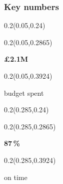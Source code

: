 \documentclass[aspectratio=169]{beamer}
\begin{document}
\begin{frame}[t]
  \frametitle{Key numbers}

%
\begin{textblock}{0.2}(0.05,0.24)
\end{textblock}

\begin{textblock}{0.2}(0.05,0.2865)
{\centering\fontsize{26}{31}\selectfont \textcolor[HTML]{FFFFFF}{\textbf{£2.1M}}\par}
\end{textblock}

\begin{textblock}{0.2}(0.05,0.3924)
{\centering\fontsize{12}{14}\selectfont \textcolor[HTML]{FFFFFF}{budget spent}\par}
\end{textblock}

%
\begin{textblock}{0.2}(0.285,0.24)
\end{textblock}

\begin{textblock}{0.2}(0.285,0.2865)
{\centering\fontsize{26}{31}\selectfont \textcolor[HTML]{FFFFFF}{\textbf{87\,\%}}\par}
\end{textblock}

\begin{textblock}{0.2}(0.285,0.3924)
{\centering\fontsize{12}{14}\selectfont \textcolor[HTML]{FFFFFF}{on time}\par}
\end{textblock}


\end{frame}
\end{document}

